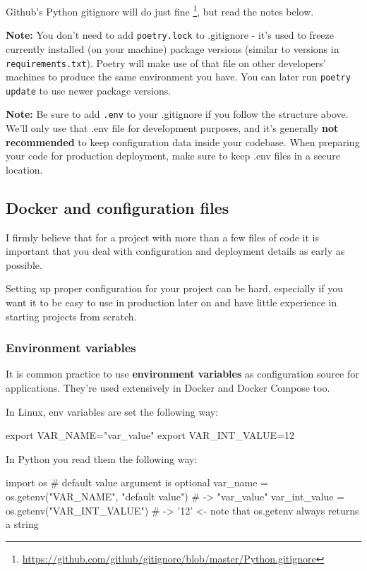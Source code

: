 \documentclass[14pt]{extarticle}
\newcommand{\flink}[1]{\footnote{\href{#1}{#1}}}
\newcommand{\note}{\textbf{\color{red}Note: }}
\newcommand{\bashinline}[1]{\lstinline[language=bash, style=cstyle, morekeywords={docker, poetry, git, mv, python, uvicorn}, basicstyle=\ttfamily\normalsize]{#1}}
\begin{document}
Github's Python gitignore will do just fine \flink{https://github.com/github/gitignore/blob/master/Python.gitignore}, but read the notes below.

\note You don't need to add \texttt{poetry.lock} to .gitignore - it's used to freeze currently installed (on your machine) package versions (similar to versions in \texttt{requirements.txt}). Poetry will make use of that file on other developers' machines to produce the same environment you have. You can later run \bashinline{poetry update} to use newer package versions.

\note Be sure to add \texttt{.env} to your .gitignore if you follow the structure above. We'll only use that .env file for development purposes, and it's generally \textbf{not recommended} to keep configuration data inside your codebase. When preparing your code for production deployment, make sure to keep .env files in a secure location.

\subsection{Docker and configuration files}

I firmly believe that for a project with more than a few files of code it is important that you deal with configuration and deployment details as early as possible.

Setting up proper configuration for your project can be hard, especially if you want it to be easy to use in production later on and have little experience in starting projects from scratch.

\subsubsection{Environment variables}

It is common practice to use \textbf{environment variables} as configuration source for applications. They're used extensively in Docker and Docker Compose too.

In Linux, env variables are set the following way:

\begin{bashcode}
    export VAR_NAME="var_value"
    export VAR_INT_VALUE=12
\end{bashcode}

In Python you read them the following way:

\begin{pycode}
    import os
    # default value argument is optional
    var_name = os.getenv("VAR_NAME", "default value") # -> "var_value"
    var_int_value = os.getenv("VAR_INT_VALUE") # -> '12' <- note that os.getenv always returns a string
\end{pycode}
\end{document}

